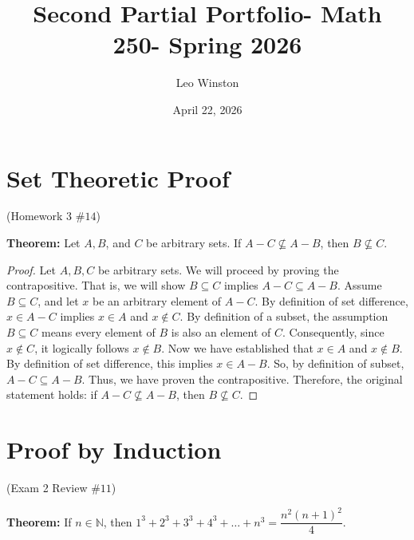 \documentclass[12pt]{amsart}
\title{Second Partial Portfolio- Math 250- Spring 2026}
\author{Leo Winston}
\date{April 22, 2026}
\begin{document}
\maketitle
\section{Set Theoretic Proof}
{\begin{center}(Homework 3 $\#14$)\end{center}}
\textbf{Theorem:}{ Let $A, B$, and $C$ be arbitrary sets. If $A-C \nsubseteq A-B$, then $B \nsubseteq C$.}
\begin{proof}
Let $A, B, C$ be arbitrary sets. We will proceed by proving the contrapositive. That is, we will show $B \subseteq C$ implies $A-C \subseteq A-B$. Assume $B \subseteq C$, and let $x$ be an arbitrary element of $A - C$. By definition of set difference, $x \in A - C$ implies $x \in A$ and $x \not \in C$. By definition of a subset, the assumption $B \subseteq C$ means every element of $B$ is also an element of $C$. Consequently, since $x \notin C$, it logically follows $x \notin B$.
Now we have established that $x \in A$ and $x \notin B$. By definition of set difference, this implies $x \in A - B$. So, by definition of subset, $A - C \subseteq A - B$. Thus, we have proven the contrapositive. Therefore, the original statement holds: if $A - C \not\subseteq A - B$, then $ B \not\subseteq C$.
\end{proof}
\newpage

\section{Proof by Induction}
\begin{center}(Exam 2 Review $\#11$)\end{center}

\textbf{Theorem:} If $n \in \mathbb{N}$, then 
$1^3+2^3+3^3+4^3+\dots+n^3=\dfrac{n^2(n+1)^2}{4}$.
\end{document}
